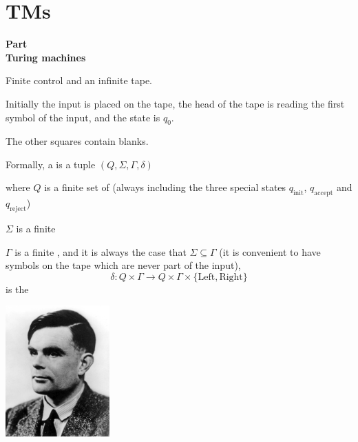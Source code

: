 \section{TMs}

\begin{frame}
\begin{center}
\addtocounter{part}{1}
{\bf Part  \\ Turing machines}
\end{center}
\end{frame}

\begin{frame}
Finite control and an infinite tape.

Initially the input is placed on the tape, the head of the tape is
reading the first symbol of the input, and the state is $q_0$.

The other squares contain blanks.

Formally, a  is a tuple 
$(Q,\Sigma,\Gamma,\delta)$

where $Q$ is a finite set of  (always
including the three special states $q_{\text{init}}$,
$q_{\text{accept}}$ and
$q_{\text{reject}}$)

$\Sigma$ is a finite  

$\Gamma$ is a finite , and it is always the case that $\Sigma\subseteq\Gamma$ (it
is convenient to have symbols on the tape which are never part of the
input),
$$
\delta:Q\times\Gamma\rightarrow
Q\times\Gamma\times\{\text{Left},\text{Right}\}
$$ 
is the 
\end{frame}

\begin{frame}
\begin{minipage}{5cm}
\includegraphics[width=4cm]{figures/AlanTuring.jpg}
\end{minipage}
\begin{minipage}{5cm}
 \\
\end{minipage}
\end{frame}


